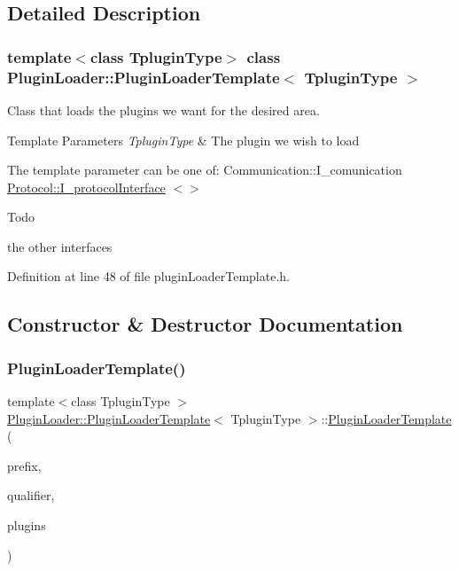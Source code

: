 \subsection{Detailed Description}
\subsubsection*{template$<$class Tplugin\+Type$>$\newline
class Plugin\+Loader\+::\+Plugin\+Loader\+Template$<$ Tplugin\+Type $>$}

Class that loads the plugins we want for the desired area. 


\begin{DoxyTemplParams}{Template Parameters}
{\em Tplugin\+Type} & The plugin we wish to load\\
\hline
\end{DoxyTemplParams}
The template parameter can be one of\+: Communication\+::\+I\+\_\+comunication \mbox{\hyperlink{classProtocol_1_1I__protocolInterface}{Protocol\+::\+I\+\_\+protocol\+Interface}} $<$$>$

\begin{DoxyRefDesc}{Todo}
\item[\mbox{\hyperlink{todo__todo000021}{Todo}}]the other interfaces \end{DoxyRefDesc}


Definition at line 48 of file plugin\+Loader\+Template.\+h.



\subsection{Constructor \& Destructor Documentation}
\mbox{\label{classPluginLoader_1_1PluginLoaderTemplate_a6de1c3f2ff295225c6f10d891ffa0048}} 
\subsubsection{\texorpdfstring{PluginLoaderTemplate()}{PluginLoaderTemplate()}}
{\footnotesize\ttfamily template$<$class Tplugin\+Type $>$ \\
\mbox{\hyperlink{classPluginLoader_1_1PluginLoaderTemplate}{Plugin\+Loader\+::\+Plugin\+Loader\+Template}}$<$ Tplugin\+Type $>$\+::\mbox{\hyperlink{classPluginLoader_1_1PluginLoaderTemplate}{Plugin\+Loader\+Template}} (\begin{DoxyParamCaption}\item[{std\+::string const \&}]{prefix,  }\item[{std\+::string const \&}]{qualifier,  }\item[{\mbox{\hyperlink{namespacePluginLoader_a8e505caea20d9f45155939545d29f6ba}{shared\+Map\+\_\+t}}$<$ Tplugin\+Type $>$ \&}]{plugins }\end{DoxyParamCaption})}



